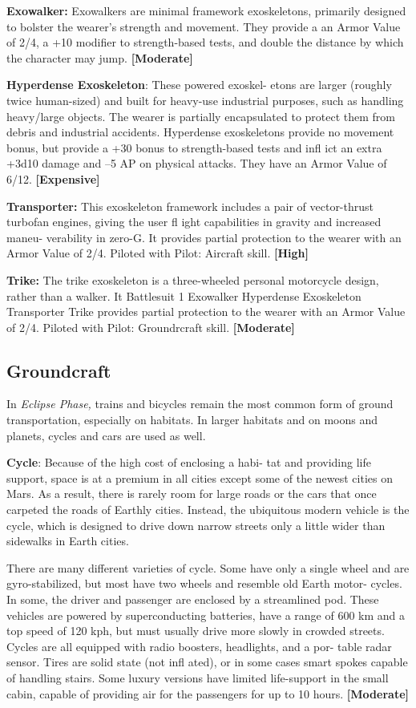 \textbf{Exowalker:} Exowalkers are minimal framework 
exoskeletons, primarily designed to bolster the 
wearer's strength and movement. They provide a an 
Armor Value of 2/4, a +10 modifier to strength-based 
tests, and double the distance by which the character 
may jump. \textbf{[Moderate]}

\textbf{Hyperdense Exoskeleton}: These powered exoskel-
etons are larger (roughly twice human-sized) and built 
for heavy-use industrial purposes, such as handling 
heavy/large objects. The wearer is partially encapsulated 
to protect them from debris and industrial accidents. 
Hyperdense exoskeletons provide no movement bonus, 
but provide a +30 bonus to strength-based tests and 
infl ict an extra +3d10 damage and –5 AP on physical 
attacks. They have an Armor Value of 6/12. \textbf{[Expensive]}

\textbf{Transporter:} This exoskeleton framework includes 
a pair of vector-thrust turbofan engines, giving the 
user fl ight capabilities in gravity and increased maneu-
verability in zero-G. It provides partial protection to 
the wearer with an Armor Value of 2/4. Piloted with 
Pilot: Aircraft skill. \textbf{[High]}

\textbf{Trike:} The trike exoskeleton is a three-wheeled 
personal motorcycle design, rather than a walker. It 
Battlesuit 1
Exowalker
Hyperdense 
Exoskeleton
Transporter
Trike
provides partial protection to the wearer with an 
Armor Value of 2/4. Piloted with Pilot: Groundrcraft 
skill. \textbf{[Moderate]}

\subsection{Groundcraft}

In \textit{Eclipse Phase,} trains and bicycles remain the most 
common form of ground transportation, especially on 
habitats. In larger habitats and on moons and planets, 
cycles and cars are used as well.

\textbf{Cycle}: Because of the high cost of enclosing a habi-
tat and providing life support, space is at a premium 
in all cities except some of the newest cities on Mars. 
As a result, there is rarely room for large roads or the 
cars that once carpeted the roads of Earthly cities. 
Instead, the ubiquitous modern vehicle is the cycle, 
which is designed to drive down narrow streets only a 
little wider than sidewalks in Earth cities.

There are many different varieties of cycle. Some 
have only a single wheel and are gyro-stabilized, but 
most have two wheels and resemble old Earth motor-
cycles. In some, the driver and passenger are enclosed 
by a streamlined pod. These vehicles are powered 
by superconducting batteries, have a range of 600 
km and a top speed of 120 kph, but must usually 
drive more slowly in crowded streets. Cycles are all 
equipped with radio boosters, headlights, and a por-
table radar sensor. Tires are solid state (not infl ated), 
or in some cases smart spokes capable of handling 
stairs. Some luxury versions have limited life-support 
in the small cabin, capable of providing air for the 
passengers for up to 10 hours. \textbf{[Moderate]}

